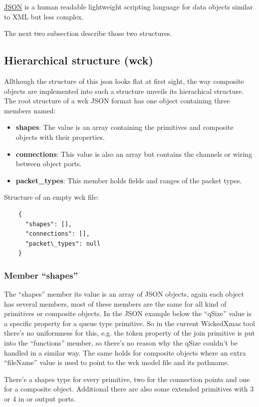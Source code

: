 \documentclass[a4paper,11pt,final]{article}
\begin{document}
\href{http://www.json.org/}{JSON} is a human readable lightweight scripting language for data objects similar
to XML but less complex.

The next two subsection describe those two structures.

\subsection{Hierarchical structure (wck)}
Allthough the structure of this json looks flat at first sight, the way composite objects are implemented into such
a structure unveils its hierachical structure.
The root structure of a wck JSON format has one object containing three members named:
\begin{itemize}
\item \textbf{shapes}: The value is an array containing the primitives and composite objects with their properties.
\item \textbf{connections}: This value is also an array but contains the channels or wiring between object ports.
\item \textbf{packet\_types}: This member holds fields and ranges of the packet types. 
\end{itemize}

Structure of an empty wck file:
\color{blue}
\begin{verbatim}
    {
      "shapes": [],
      "connections": [],
      "packet\_types": null
    }
\end{verbatim}
\color{black}

\subsubsection{Member ``shapes''}
The ``shapes'' member its value is an array of JSON objects, again each object has several members,
most of these members are the same for all kind of primitives or composite objects. In the JSON example 
below the ``qSize'' value is a specific property for a queue type primitive.
So in the current WickedXmas tool there's no uniformness for this, e.g. the token property
of the join primitive is put into the ``functions'' member, so there's no reason why the qSize couldn't be
handled in a similar way. The same holds for composite objects where an extra ``fileName'' value is used to
point to the wck model file and its pathname.

There's a shapes type for every primitive, two for the connection points and one for a composite object.
Additional there are also some extended primitives with 3 or 4 in or output ports.
\end{document}
